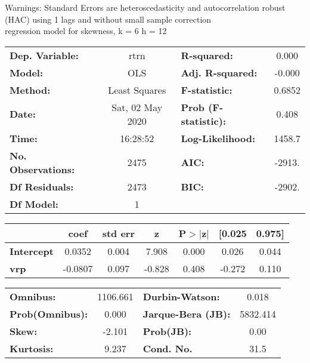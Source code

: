 Warnings: \newline
 [1] Standard Errors are heteroscedasticity and autocorrelation robust (HAC) using 1 lags and without small sample correction\\ 

regression model for skewness, k = 6 h = 12\begin{center}
\begin{tabular}{lclc}
\toprule
\textbf{Dep. Variable:}    &       rtrn       & \textbf{  R-squared:         } &     0.000   \\
\textbf{Model:}            &       OLS        & \textbf{  Adj. R-squared:    } &    -0.000   \\
\textbf{Method:}           &  Least Squares   & \textbf{  F-statistic:       } &    0.6852   \\
\textbf{Date:}             & Sat, 02 May 2020 & \textbf{  Prob (F-statistic):} &    0.408    \\
\textbf{Time:}             &     16:28:52     & \textbf{  Log-Likelihood:    } &    1458.7   \\
\textbf{No. Observations:} &        2475      & \textbf{  AIC:               } &    -2913.   \\
\textbf{Df Residuals:}     &        2473      & \textbf{  BIC:               } &    -2902.   \\
\textbf{Df Model:}         &           1      & \textbf{                     } &             \\
\bottomrule
\end{tabular}
\begin{tabular}{lcccccc}
                   & \textbf{coef} & \textbf{std err} & \textbf{z} & \textbf{P$> |$z$|$} & \textbf{[0.025} & \textbf{0.975]}  \\
\midrule
\textbf{Intercept} &       0.0352  &        0.004     &     7.908  &         0.000        &        0.026    &        0.044     \\
\textbf{vrp}       &      -0.0807  &        0.097     &    -0.828  &         0.408        &       -0.272    &        0.110     \\
\bottomrule
\end{tabular}
\begin{tabular}{lclc}
\textbf{Omnibus:}       & 1106.661 & \textbf{  Durbin-Watson:     } &    0.018  \\
\textbf{Prob(Omnibus):} &   0.000  & \textbf{  Jarque-Bera (JB):  } & 5832.414  \\
\textbf{Skew:}          &  -2.101  & \textbf{  Prob(JB):          } &     0.00  \\
\textbf{Kurtosis:}      &   9.237  & \textbf{  Cond. No.          } &     31.5  \\
\bottomrule
\end{tabular}
\end{center}

